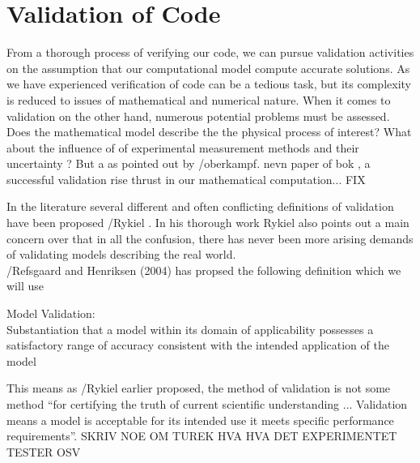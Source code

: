 \newpage                                                                                                                                             
\section{Validation of Code}
From a thorough process of verifying our code, we can pursue validation activities on the assumption that our computational model compute accurate solutions. As we have experienced verification of code can be a tedious task, but its complexity is reduced to issues of mathematical and numerical nature. When it comes to validation on the other hand, numerous potential problems must be assessed.  Does the mathematical model describe the the physical process of interest? What about the influence of of experimental measurement methods and their uncertainty ? But a as pointed out by /oberkampf. nevn paper of bok , a  successful validation rise thrust in our mathematical computation... FIX

In the literature several different and often conflicting definitions of validation have been proposed /Rykiel . In his thorough work Rykiel also points out a main concern over that in all the confusion, there has never been more arising demands of validating models describing the real world. \\

/Refsgaard and Henriksen (2004) has propsed the following definition which we will use  

\begin{defn} 
Model Validation: \\Substantiation that a model within its domain of applicability possesses a satisfactory range of accuracy consistent with the intended application of the model
\end{defn}

This means as /Rykiel earlier proposed, the method of validation is not some method ``for certifying the truth of current scientific understanding ... Validation means a model is acceptable for its intended use it meets specific performance requirements''.  SKRIV NOE OM TUREK HVA HVA DET EXPERIMENTET TESTER OSV

 

